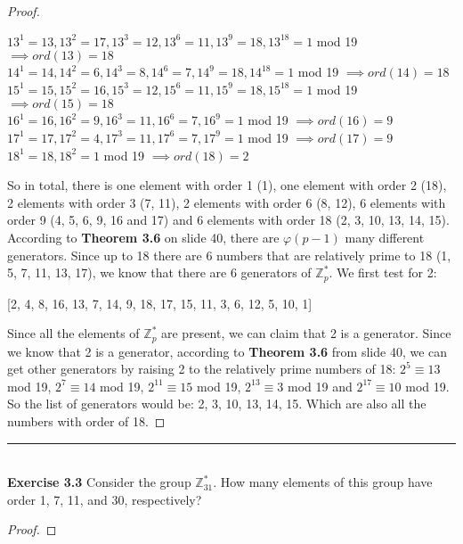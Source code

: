 \documentclass{article}
\begin{document}
\begin{proof}
\begin{center}
$13^1 = 13, 13^2 = 17, 13^3 = 12, 13^6 = 11, 13^9 = 18, 13^{18} = 1$ mod 19 $\implies ord(13) = 18$\\
$14^1 = 14, 14^2 = 6, 14^3 = 8, 14^6 = 7, 14^9 = 18, 14^{18} = 1$ mod 19 $\implies ord(14) = 18$\\
$15^1 = 15, 15^2 = 16, 15^3 = 12, 15^6 = 11, 15^9 = 18, 15^{18} = 1$ mod 19 $\implies ord(15) = 18$\\
$16^1 = 16, 16^2 = 9, 16^3 = 11, 16^6 = 7, 16^9 = 1$ mod 19 $\implies ord(16) = 9$\\
$17^1 = 17, 17^2 = 4, 17^3 = 11, 17^6 = 7, 17^9 = 1$ mod 19 $\implies ord(17) = 9$\\
$18^1 = 18, 18^2 = 1$ mod 19 $\implies ord(18) = 2$\\
\end{center}
So in total, there is one element with order 1 (1), one element with order 2 (18), 2 elements with order 3 (7, 11), 2 elements with order 6 (8, 12), 6 elements with order 9 (4, 5, 6, 9, 16 and 17) and 6 elements with order 18 (2, 3, 10, 13, 14, 15).
According to \textbf{Theorem 3.6} on slide 40, there are $\varphi(p - 1)$ many different generators. Since up to 18 there are 6 numbers that are relatively prime to 18 (1, 5, 7, 11, 13, 17), we know that there are 6 generators of $\mathbb{Z}^{*}_{p}$. We first test for 2:
\begin{center}
[2, 4, 8, 16, 13, 7, 14, 9, 18, 17, 15, 11, 3, 6, 12, 5, 10, 1]
\end{center}
 Since all the elements of $\mathbb{Z}^{*}_{p}$ are present, we can claim that 2 is a generator. Since we know that 2 is a generator, according to \textbf{Theorem 3.6} from slide 40, we can get other generators by raising 2 to the relatively prime numbers of 18:  $2^{5} \equiv 13$ mod 19, $2^{7} \equiv 14$ mod 19, $2^{11} \equiv 15$ mod 19, $2^{13} \equiv 3$ mod 19 and $2^{17} \equiv 10$ mod 19. So the list of generators would be: 2, 3, 10, 13, 14, 15. Which are also all the numbers with order of 18.
\end{proof}



\noindent\rule{12cm}{0.4pt}\\
\noindent \textbf{Exercise 3.3} Consider the group $\mathbb{Z}^{*}_{31}$. How many elements of this group have order 1, 7, 11, and 30, respectively?
\begin{proof}
	
\end{proof}
\end{document}
